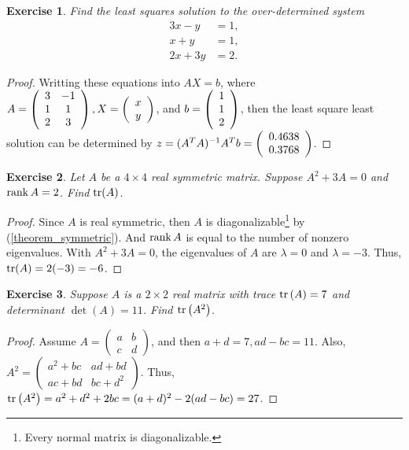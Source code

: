 \documentclass[11pt]{book}
\newtheorem{exercise}{Exercise}[section]
\theoremstyle{definition}
\numberwithin{equation}{subsection}
\begin{document}
\begin{exercise}
Find the least squares solution to the over-determined system%
\begin{align*}
3x-y  &  =1,\\
x+y  &  =1,\\
2x+3y  &  =2.
\end{align*}
\end{exercise}
\begin{proof}
Writting these equations into $AX=b$, where $A = \left(\begin{array}
    [c]{cc}%
    3 & -1\\
    1 & 1\\
    2 & 3
    \end{array}\right), X = \left(\begin{array}
    [c]{c}%
    x\\
    y\\
    \end{array}\right)$, and $b = \left(\begin{array}
    [c]{c}%
    1\\
    1\\
    2
    \end{array}\right)$, then the least square least solution can be determined by $z = (A^TA)^{-1}A^T b = \left(\begin{array}
    [c]{c}%
    0.4638\\
    0.3768\\
    \end{array}\right)
    $.
\end{proof}

\medskip

\begin{exercise}{\bf *}
Let $A$ be a $4 \times 4$ real symmetric matrix. Suppose $A^2 + 3A = 0$ and $\rank A = 2$. Find ${\rm tr}(A)$.
\end{exercise}
\begin{proof}
Since $A$ is real symmetric, then $A$ is diagonalizable\footnote{Every normal matrix is diagonalizable\cite{21}.} by (\ref{theorem_symmetric}). And $\rank A$ is equal to the number of nonzero eigenvalues. With $A^2 + 3A = 0$, the eigenvalues of $A$ are $\lambda = 0$ and $\lambda = -3$. Thus, ${\rm tr}(A) = 2(-3) = -6$.
\end{proof}

\medskip

\begin{exercise}
Suppose $A$ is a $2 \times 2$ real matrix with trace ${\rm tr}\left(A \right) = 7$ and determinant $\det (A) = 11$. Find ${\rm tr}\left(A^2 \right)$.
\end{exercise}
\begin{proof}
Assume $A = \begin{pmatrix} a & b \\ c & d \end{pmatrix}$, and then $a + d = 7, ad - bc = 11$. Also, $A^2 = \begin{pmatrix} a^2+bc &ad+bd \\ ac+bd & bc+d^2 \end{pmatrix}$. Thus, ${\rm tr}\left(A^2 \right) = a^2 + d^2 + 2bc = (a+d)^2 - 2(ad-bc) = 27$.
\end{proof}
\end{document}
